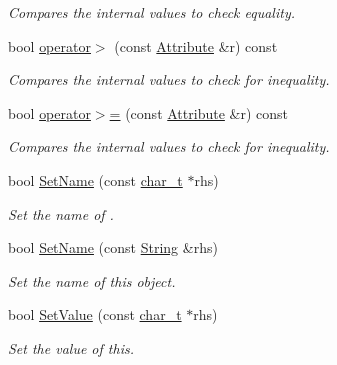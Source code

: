 \begin{DoxyCompactItemize}
\begin{DoxyCompactList}\small\item\em Compares the internal values to check equality. \item\end{DoxyCompactList}\item 
bool \hyperlink{classMezzanine_1_1xml_1_1Attribute_ac4f2953b35e932943be7c74e7ed709c1}{operator$>$} (const \hyperlink{classMezzanine_1_1xml_1_1Attribute}{Attribute} \&r) const 
\begin{DoxyCompactList}\small\item\em Compares the internal values to check for inequality. \item\end{DoxyCompactList}\item 
bool \hyperlink{classMezzanine_1_1xml_1_1Attribute_a1edd7d0e101586df151b2347818e2483}{operator$>$=} (const \hyperlink{classMezzanine_1_1xml_1_1Attribute}{Attribute} \&r) const 
\begin{DoxyCompactList}\small\item\em Compares the internal values to check for inequality. \item\end{DoxyCompactList}\item 
bool \hyperlink{classMezzanine_1_1xml_1_1Attribute_a749c66a49a9017ea6d3d7cddf1adae68}{SetName} (const \hyperlink{namespaceMezzanine_1_1xml_a29b8a47c179e9895c4e9e66c45d1dbbc}{char\_\-t} $\ast$rhs)
\begin{DoxyCompactList}\small\item\em Set the name of . \item\end{DoxyCompactList}\item 
bool \hyperlink{classMezzanine_1_1xml_1_1Attribute_adaa012e942209fe0533322fc45a45333}{SetName} (const \hyperlink{namespaceMezzanine_1_1xml_a3ddf35656ecc38b6fa1d0364d9ad3b2c}{String} \&rhs)
\begin{DoxyCompactList}\small\item\em Set the name of this object. \item\end{DoxyCompactList}\item 
bool \hyperlink{classMezzanine_1_1xml_1_1Attribute_a850c7d6692ac542ea197952c734e3800}{SetValue} (const \hyperlink{namespaceMezzanine_1_1xml_a29b8a47c179e9895c4e9e66c45d1dbbc}{char\_\-t} $\ast$rhs)
\begin{DoxyCompactList}\small\item\em Set the value of this. \item\end{DoxyCompactList}\item 

\end{DoxyCompactItemize}
